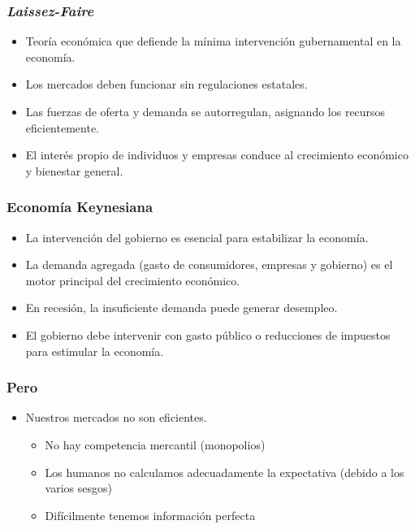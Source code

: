 \documentclass{beamer}
\begin{document}
\begin{frame}
\frametitle{\emph{Laissez-Faire}}
\begin{itemize}
\pause
    \item Teoría económica que defiende la mínima intervención gubernamental en la economía.
    \pause
    \item Los mercados deben funcionar sin regulaciones estatales.
    \pause
    \item Las fuerzas de oferta y demanda se autorregulan, asignando los recursos eficientemente.
    \pause
    \item El interés propio de individuos y empresas conduce al crecimiento económico y bienestar general.
\end{itemize}
\end{frame}


\begin{frame}
\frametitle{Economía Keynesiana}
\begin{itemize}
    \pause
    \item La intervención del gobierno es esencial para estabilizar la economía.
    \pause
    \item La demanda agregada (gasto de consumidores, empresas y gobierno) es el motor principal del crecimiento económico.
    \pause
    \item En recesión, la insuficiente demanda puede generar desempleo.
    \pause
    \item El gobierno debe intervenir con gasto público o reducciones de impuestos para estimular la economía.
\end{itemize}
\end{frame}

\begin{frame}
\frametitle{Pero}
\begin{itemize}
\item Nuestros mercados no son eficientes.
\begin{itemize}
\item No hay competencia mercantil (monopolios)
\pause
\item Los humanos no calculamos adecuadamente la expectativa (debido a los varios sesgos)
\pause
\item Difícilmente tenemos información perfecta
\end{itemize}
\end{itemize}
\end{frame}



\end{document}
